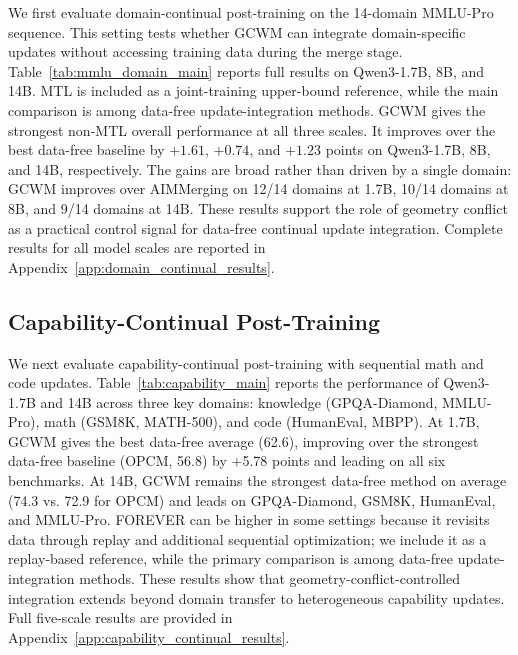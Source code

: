 \documentclass{article}
\begin{document}
We first evaluate domain-continual post-training on the 14-domain MMLU-Pro sequence.
This setting tests whether GCWM can integrate domain-specific updates without accessing training data during the merge stage.
Table~\ref{tab:mmlu_domain_main} reports full results on Qwen3-1.7B, 8B, and 14B.
MTL is included as a joint-training upper-bound reference, while the main comparison is among data-free update-integration methods.
GCWM gives the strongest non-MTL overall performance at all three scales.
It improves over the best data-free baseline by \(+1.61\), \(+0.74\), and \(+1.23\) points on Qwen3-1.7B, 8B, and 14B, respectively.
The gains are broad rather than driven by a single domain: GCWM improves over AIMMerging on 12/14 domains at 1.7B, 10/14 domains at 8B, and 9/14 domains at 14B.
These results support the role of geometry conflict as a practical control signal for data-free continual update integration.
Complete results for all model scales are reported in Appendix~\ref{app:domain_continual_results}.



\vspace{-0.4em}
\subsection{Capability-Continual Post-Training}
\label{sec:capability_continual}
\vspace{-0.2em}
We next evaluate capability-continual post-training with sequential math and code updates.
Table~\ref{tab:capability_main} reports the performance of Qwen3-1.7B and 14B across three key domains: knowledge (GPQA-Diamond, MMLU-Pro), math (GSM8K, MATH-500), and code (HumanEval, MBPP).
At 1.7B, GCWM gives the best data-free average (62.6), improving over the strongest data-free baseline (OPCM, 56.8) by +5.78 points and leading on all six benchmarks.
At 14B, GCWM remains the strongest data-free method on average (74.3 vs. 72.9 for OPCM) and leads on GPQA-Diamond, GSM8K, HumanEval, and MMLU-Pro.
FOREVER can be higher in some settings because it revisits data through replay and additional sequential optimization; we include it as a replay-based reference, while the primary comparison is among data-free update-integration methods.
These results show that geometry-conflict-controlled integration extends beyond domain transfer to heterogeneous capability updates.
Full five-scale results are provided in Appendix~\ref{app:capability_continual_results}.
\end{document}
